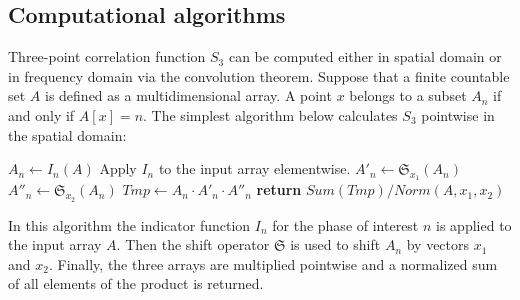 \documentclass[reprint,amsmath,amssymb,aps,pre,showkeys,showpacs]{revtex4-1}
\begin{document}
\subsection{Computational algorithms}
Three-point correlation function $S_3$ can be computed either in spatial domain
or in frequency domain via the convolution theorem. Suppose that a finite
countable set $A$ is defined as a multidimensional array. A point $x$ belongs to
a subset $A_n$ if and only if $A[x] = n$. The simplest algorithm below
calculates $S_3$ pointwise in the spatial domain:
\begin{algorithmic}[1]
  \State $A_n \gets I_n (A)$
  \Comment Apply $I_n$ to the input array elementwise.
  \State $A'_n \gets \mathfrak{S}_{x_1}(A_n)$
  \State $A''_n \gets \mathfrak{S}_{x_2}(A_n)$
  \State $Tmp \gets A_n \cdot A'_n \cdot A''_n$
  \State \textbf{return} $Sum(Tmp) / Norm(A, x_1, x_2)$
  \EndProcedure
\end{algorithmic}
In this algorithm the indicator function $I_n$ for the phase of interest $n$ is
applied to the input array $A$. Then the shift operator $\mathfrak{S}$ is used
to shift $A_n$ by vectors $x_1$ and $x_2$. Finally, the three arrays are
multiplied pointwise and a normalized sum of all elements of the product is
returned.
\end{document}
